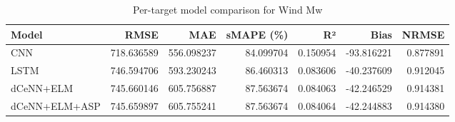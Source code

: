 \begin{table}
\caption{Per-target model comparison for Wind Mw}
\begin{tabular}{lrrrrrr}
\toprule
Model & RMSE & MAE & sMAPE (\%) & R² & Bias & NRMSE \\
\midrule
CNN & 718.636589 & 556.098237 & 84.099704 & 0.150954 & -93.816221 & 0.877891 \\
LSTM & 746.594706 & 593.230243 & 86.460313 & 0.083606 & -40.237609 & 0.912045 \\
dCeNN+ELM & 745.660146 & 605.756887 & 87.563674 & 0.084063 & -42.246529 & 0.914381 \\
dCeNN+ELM+ASP & 745.659897 & 605.755241 & 87.563674 & 0.084064 & -42.244883 & 0.914380 \\
\bottomrule
\end{tabular}
\end{table}
